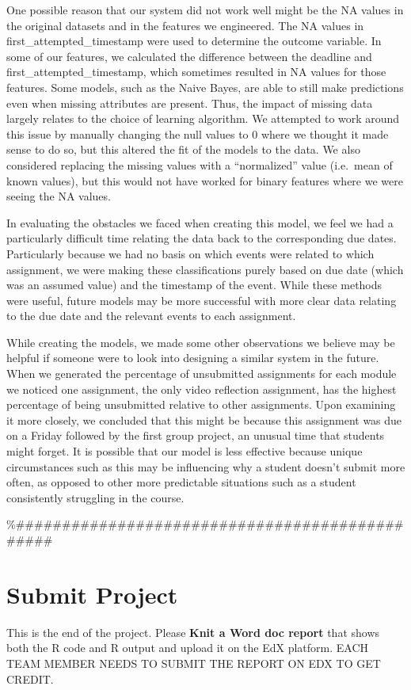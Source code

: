 \documentclass[
]{article}
\begin{document}
One possible reason that our system did not work well might be the NA
values in the original datasets and in the features we engineered. The
NA values in first\_attempted\_timestamp were used to determine the
outcome variable. In some of our features, we calculated the difference
between the deadline and first\_attempted\_timestamp, which sometimes
resulted in NA values for those features. Some models, such as the Naive
Bayes, are able to still make predictions even when missing attributes
are present. Thus, the impact of missing data largely relates to the
choice of learning algorithm. We attempted to work around this issue by
manually changing the null values to 0 where we thought it made sense to
do so, but this altered the fit of the models to the data. We also
considered replacing the missing values with a ``normalized'' value
(i.e.~mean of known values), but this would not have worked for binary
features where we were seeing the NA values.

In evaluating the obstacles we faced when creating this model, we feel
we had a particularly difficult time relating the data back to the
corresponding due dates. Particularly because we had no basis on which
events were related to which assignment, we were making these
classifications purely based on due date (which was an assumed value)
and the timestamp of the event. While these methods were useful, future
models may be more successful with more clear data relating to the due
date and the relevant events to each assignment.

While creating the models, we made some other observations we believe
may be helpful if someone were to look into designing a similar system
in the future. When we generated the percentage of unsubmitted
assignments for each module we noticed one assignment, the only video
reflection assignment, has the highest percentage of being unsubmitted
relative to other assignments. Upon examining it more closely, we
concluded that this might be because this assignment was due on a Friday
followed by the first group project, an unusual time that students might
forget. It is possible that our model is less effective because unique
circumstances such as this may be influencing why a student doesn't
submit more often, as opposed to other more predictable situations such
as a student consistently struggling in the course.

\%\#\#\#\#\#\#\#\#\#\#\#\#\#\#\#\#\#\#\#\#\#\#\#\#\#\#\#\#\#\#\#\#\#\#\#\#\#\#\#\#\#\#\#\#\#\#\#

\hypertarget{submit-project}{%
\section{Submit Project}\label{submit-project}}

This is the end of the project. Please \textbf{Knit a Word doc report}
that shows both the R code and R output and upload it on the EdX
platform. EACH TEAM MEMBER NEEDS TO SUBMIT THE REPORT ON EDX TO GET
CREDIT.
\end{document}
